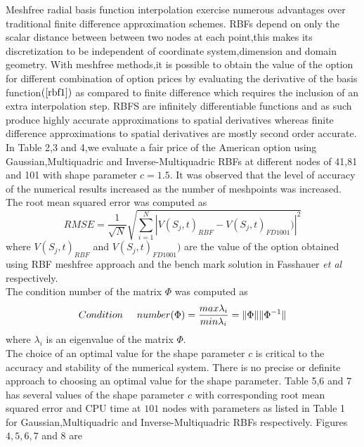 \documentclass[12pt]{article}
\numberwithin{equation}{subsection} %
\begin{document}
  Meshfree radial basis function
interpolation exercise numerous advantages over traditional finite
difference approximation schemes. RBFs depend on only the scalar
distance between between two nodes at each point,this makes its
discretization to be independent of coordinate system,dimension and
domain geometry. With meshfree methods,it is possible to obtain the
value of the option for different combination of option prices by
evaluating the derivative of the basis function$(\ref{rbf1})$ as
compared to finite difference which requires the inclusion of an
extra interpolation step. RBFS are infinitely differentiable
functions and as such produce highly accurate approximations to
spatial derivatives whereas finite difference approximations  to
spatial derivatives are
mostly second order accurate.\\
   In Table 2,3 and 4,we evaluate  a fair price of the
   American option using Gaussian,Multiquadric and
   Inverse-Multiquadric RBFs at different nodes of 41,81 and 101
   with shape parameter $c=1.5$. It was observed that the level of
   accuracy of the numerical results increased as the number of
   meshpoints was increased. The root mean squared error was
   computed as
   \begin{equation*}
RMSE=\frac{1}{\sqrt{N}}\sqrt{\displaystyle\sum\limits_{i=1}^N
|V(S_j,t)_{RBF}-V(S_j,t)_{FD1001})|^2}
   \end{equation*}
   where $V(S_j,t)_{RBF}$ and $V(S_j,t)_{FD1001})$ are the value of
   the option obtained using RBF meshfree approach  and  the bench
   mark solution in Fasshauer \textit{et al} \cite{Fas02}
   respectively.\\
   The condition number of the matrix $\Phi$ was computed as
   \begin{equation*}
   Condition \hspace{5mm} number(\Phi)=\frac{max \lambda_i}{min \lambda_i}=\|\Phi\|\|\Phi^{-1}\|
   \end{equation*}
   where $\lambda_i$ is an eigenvalue of the matrix $\Phi$.\\
   The choice of an optimal value for the shape parameter $c$ is
  critical to the accuracy and stability of the numerical
  system. There is no precise or definite  approach to choosing an
  optimal value for the shape parameter. Table 5,6 and 7 has several
  values of the shape parameter $c$ with corresponding root mean
  squared error and CPU time at $101$ nodes with parameters  as
  listed in Table 1 for  Gaussian,Multiquadric and
   Inverse-Multiquadric RBFs respectively. Figures $4,5,6,7$ and $8$ are
\end{document}
